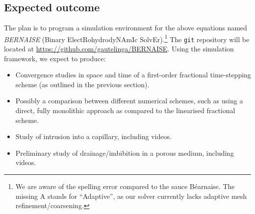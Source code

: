 \documentclass[a4paper,10pt]{article}
\begin{document}
\subsection*{Expected outcome} 
The plan is to program a simulation environment for the above equations named \emph{BERNAISE} (Binary ElectRohydrodyNAmIc SolvEr).\footnote{We are aware of the spelling error compared to the sauce B\'{e}arnaise. The missing A stands for ``Adaptive'', as our solver currently lacks adaptive mesh refinement/coarsening.}
The \texttt{git} repository will be located at \url{https://github.com/gautelinga/BERNAISE}.
Using the simulation framework, we expect to produce:
\begin{itemize}
\item Convergence studies in space and time of a first-order fractional time-stepping scheme (as outlined in the previous section).
\item Possibly a comparison between different numerical schemes, such as using a direct, fully monolithic approach as compared to the linearised fractional scheme.
\item Study of intrusion into a capillary, including videos.
\item Preliminary study of drainage/imbibition in a porous medium, including videos.
\end{itemize}



\end{document}

